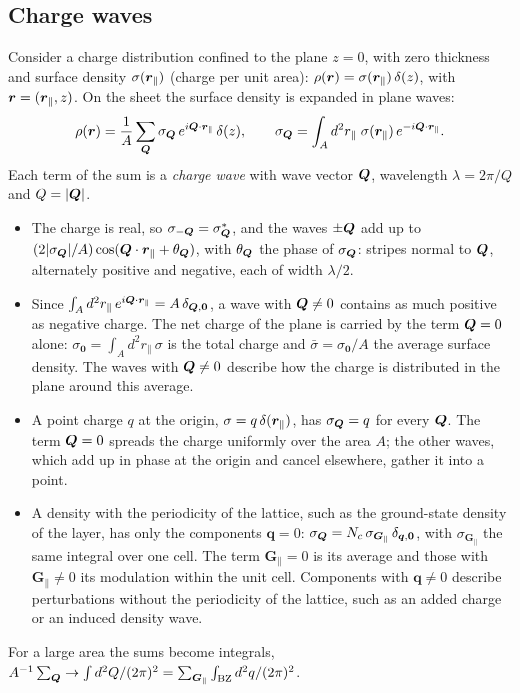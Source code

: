 \documentclass[10pt,a4paper]{paper}
\begin{document}
\subsection{Charge waves}
\label{sec:charge_density}

Consider a charge distribution confined to the plane $z = 0$, with zero thickness and surface density $\sigma(\bm{r}_{\parallel})$
(charge per unit area): $\rho(\bm{r}) = \sigma(\bm{r}_{\parallel})\,\delta(z)$, with $\bm{r} = (\bm{r}_{\parallel}, z)$. On the sheet the
surface density is expanded in plane waves:
\begin{equation}
\rho(\bm{r}) = \frac{1}{A}\sum_{\bm{Q}}\sigma_{\bm{Q}}\,e^{i\bm{Q}\cdot\bm{r}_{\parallel}}\,\delta(z) , \qquad
\sigma_{\bm{Q}} = \int_A d^2r_{\parallel}\;\sigma(\bm{r}_{\parallel})\,e^{-i\bm{Q}\cdot\bm{r}_{\parallel}} .
\label{eq:rho_waves}
\end{equation}
Each term of the sum is a \emph{charge wave} with wave vector $\bm{Q}$, wavelength $\lambda = 2\pi/Q$ and $Q = |\bm{Q}|$.
\begin{itemize}
\item The charge is real, so $\sigma_{-\bm{Q}} = \sigma_{\bm{Q}}^*$, and the waves $\pm\bm{Q}$ add up to
  $(2|\sigma_{\bm{Q}}|/A)\cos(\bm{Q}\cdot\bm{r}_{\parallel} + \theta_{\bm{Q}})$, with $\theta_{\bm{Q}}$ the phase of $\sigma_{\bm{Q}}$: stripes
  normal to $\bm{Q}$, alternately positive and negative, each of width $\lambda/2$.
\item Since $\int_A d^2r_{\parallel}\,e^{i\bm{Q}\cdot\bm{r}_{\parallel}} = A\,\delta_{\bm{Q},\bm{0}}$, a wave with $\bm{Q} \neq 0$ contains
  as much positive as negative charge. The net charge of the plane is carried by the term $\bm{Q} = 0$ alone:
  $\sigma_{\bm{0}} = \int_A d^2r_{\parallel}\,\sigma$ is the total charge and $\bar{\sigma} = \sigma_{\bm{0}}/A$ the
  average surface density. The waves with $\bm{Q} \neq 0$ describe how the charge is distributed in the plane around
  this average.
\item A point charge $q$ at the origin, $\sigma = q\,\delta(\bm{r}_{\parallel})$, has $\sigma_{\bm{Q}} = q$ for every $\bm{Q}$. The
  term $\bm{Q} = 0$ spreads the charge uniformly over the area $A$; the other waves, which add up in phase at the origin
  and cancel elsewhere, gather it into a point.
\item A density with the periodicity of the lattice, such as the ground-state density of the layer, has only the
  components $\bm{q} = 0$: $\sigma_{\bm{Q}} = N_c\,\sigma_{\bm{G}_{\parallel}}\,\delta_{\bm{q},\bm{0}}$, with
  $\sigma_{\bm{G}_{\parallel}}$ the same integral over one cell. The term $\bm{G}_{\parallel} = 0$ is its average and
  those with $\bm{G}_{\parallel} \neq 0$ its modulation within the unit cell. Components with $\bm{q} \neq 0$
  describe perturbations without the periodicity of the lattice, such as an added charge or an induced density wave.
\end{itemize}
For a large area the sums become integrals,
$A^{-1}\sum_{\bm{Q}} \to \int d^2Q/(2\pi)^2 = \sum_{\bm{G}_{\parallel}}\int_{\mathrm{BZ}} d^2q/(2\pi)^2$.
\end{document}
